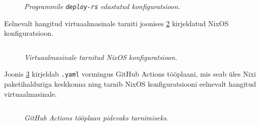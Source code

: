 \begin{figure}
\inputminted[breaklines]{nix}{chapters/data/deploys.nix}
\caption{\emph{Programmile \texttt{deploy-rs} edastatud konfiguratsioon.}}\label{fig:deploy-rs-config}
\end{figure}

Eelnevalt hangitud virtuaalmasinale tarniti joonises \ref{fig:ec2-config} kirjeldatud NixOS konfiguratsioon. 

\begin{figure}
\inputminted[breaklines]{nix}{chapters/data/ec2-config.nix}
\caption{\emph{Virtuaalmasinale tarnitud NixOS konfiguratsioon.}}\label{fig:ec2-config}
\end{figure}

Joonis \ref{fig:cd-yaml} kirjeldab \texttt{.yaml} vormingus GitHub Actions tööplaani, mis seab üles Nixi paketihalduriga keskkonna ning tarnib NixOS konfiguratsiooni eelnevalt hangitud virtuaalmasinale.

\begin{figure}
\inputminted[breaklines]{yaml}{chapters/data/cd.yaml}
\caption{\emph{GitHub Actions tööplaan pidevaks tarnimiseks.}}\label{fig:cd-yaml}
\end{figure}

